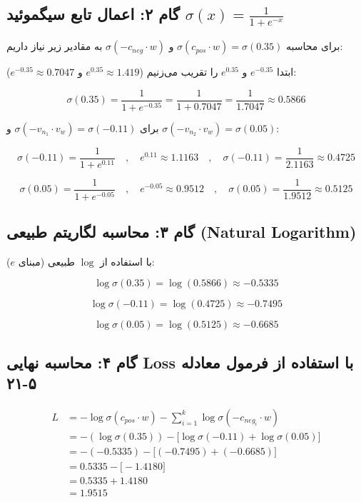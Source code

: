\documentclass[11pt,a4paper]{article}
\newcommand{\en}[1]{\textenglish{#1}}
\begin{document}
\subsection{گام ۲: اعمال تابع سیگموئید \(\sigma(x) = \frac{1}{1+e^{-x}}\)}
برای محاسبه \(\sigma(c_{pos} \cdot w) = \sigma(0.35)\) و \(\sigma(-c_{neg} \cdot w)\) به مقادیر زیر نیاز داریم:

ابتدا \(e^{-0.35}\) و \(e^{0.35}\) را تقریب می‌زنیم (\(e^{0.35} \approx 1.419\) و \(e^{-0.35} \approx 0.7047\)):

\[
\sigma(0.35) = \frac{1}{1 + e^{-0.35}} = \frac{1}{1 + 0.7047} = \frac{1}{1.7047} \approx 0.5866
\]

برای \(\sigma(-v_{n_1} \cdot v_w) = \sigma(-0.11)\) و \(\sigma(-v_{n_2} \cdot v_w) = \sigma(0.05)\):

\[
\sigma(-0.11) = \frac{1}{1 + e^{0.11}} \quad,\quad e^{0.11} \approx 1.1163 \quad,\quad \sigma(-0.11) = \frac{1}{2.1163} \approx 0.4725
\]

\[
\sigma(0.05) = \frac{1}{1 + e^{-0.05}} \quad,\quad e^{-0.05} \approx 0.9512 \quad,\quad \sigma(0.05) = \frac{1}{1.9512} \approx 0.5125
\]

\subsection{گام ۳: محاسبه لگاریتم طبیعی \en{(Natural Logarithm)}}
با استفاده از \(\log\) طبیعی (مبنای \(e\)):

\[
\log \sigma(0.35) = \log(0.5866) \approx -0.5335
\]

\[
\log \sigma(-0.11) = \log(0.4725) \approx -0.7495
\]

\[
\log \sigma(0.05) = \log(0.5125) \approx -0.6685
\]

\subsection{گام ۴: محاسبه نهایی \en{Loss} با استفاده از فرمول معادله \en{۵-۲۱}}
\begin{align*}
L &= -\log \sigma(c_{pos} \cdot w) - \sum_{i=1}^{k} \log \sigma(-c_{neg_i} \cdot w) \\
&= -(\log \sigma(0.35)) - \big[ \log \sigma(-0.11) + \log \sigma(0.05) \big] \\
&= -(-0.5335) - \big[ (-0.7495) + (-0.6685) \big] \\
&= 0.5335 - \big[ -1.4180 \big] \\
&= 0.5335 + 1.4180 \\
&= 1.9515
\end{align*}
\end{document}
